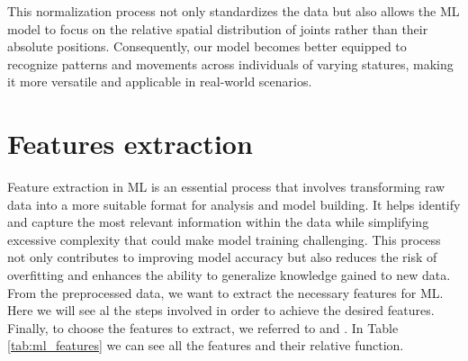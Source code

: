 This normalization process not only standardizes the data but also allows the ML model to focus on the relative spatial distribution of joints rather than their absolute positions.
Consequently, our model becomes better equipped to recognize patterns and movements across individuals of varying statures, making it more versatile and applicable in real-world scenarios. \\

\section{Features extraction}
Feature extraction in ML is an essential process that involves transforming raw data into a more suitable format for analysis and model building.
It helps identify and capture the most relevant information within the data while simplifying excessive complexity that could make model training challenging.
This process not only contributes to improving model accuracy but also reduces the risk of overfitting and enhances the ability to generalize knowledge gained to new data. \\
From the preprocessed data, we want to extract the necessary features for ML.
Here we will see al the steps involved in order to achieve the desired features. \\


Finally, to choose the features to extract, we referred to \cite{oneto:2020} and \cite{sama:2010}.
In Table \ref{tab:ml_features} we can see all the features and their relative function.

